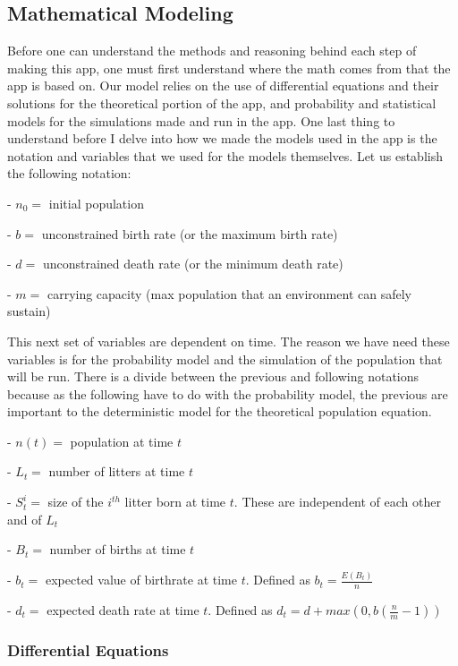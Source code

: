 \documentclass{article}\usepackage[]{graphicx}\usepackage[]{color}
\begin{document}
\subsection{Mathematical Modeling}

Before one can understand the methods and reasoning behind each step of making this app, one must first understand where the math comes from that the app is based on. Our model relies on the use of differential equations and their solutions for the theoretical portion of the app, and probability and statistical models for the simulations made and run in the app. One last thing to understand before I delve into how we made the models used in the app is the notation and variables that we used for the models themselves. Let us establish the following notation:

- \(n_0 =\) initial population

- \(b =\) unconstrained birth rate (or the maximum birth rate)

- \(d =\) unconstrained death rate (or the minimum death rate)

- \(m =\) carrying capacity (max population that an environment can safely sustain)

This next set of variables are dependent on time. The reason we have need these variables is for the probability model and the simulation of the population that will be run. There is a divide between the previous and following notations because as the following have to do with the probability model, the previous are important to the deterministic model for the theoretical population equation. 

- \(n(t) =\) population at time \(t\)

- \(L_t =\) number of litters at time \(t\)

- \(S_t^i =\) size of the \(i^{th}\) litter born at time \(t\). These are independent of each other and of \(L_t\)

- \(B_t =\) number of births at time \(t\)

- \(b_t =\) expected value of birthrate at time \(t\). Defined as \(b_t = \frac{E(B_t)}{n}\)

- \(d_t =\) expected death rate at time \(t\). Defined as \(d_t = d + max(0, b(\frac{n}{m} - 1))\)

\subsubsection{Differential Equations}
\end{document}
